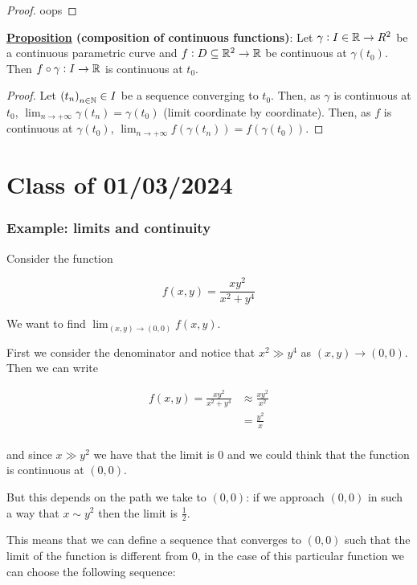 \documentclass[10pt]{extarticle}
\begin{document}
\begin{proof}
    oops
\end{proof}

\textbf{\underline{Proposition} (composition of continuous functions)}:
Let $\gamma: I \in \mathbb{R} \to R^2$ be a continuous parametric curve and $f: D \subseteq \mathbb{R}^2 \to \mathbb{R}$ be continuous at $\gamma(t_0)$.
Then $f \circ \gamma: I \to \mathbb{R}$ is continuous at $t_0$.

\begin{proof}
    Let $\left(t_n\right)_{n \in \mathbb{N}} \in I$ be a sequence converging to $t_0$.
    Then, as $\gamma$ is continuous at $t_0$, $\lim_{n \to +\infty} \gamma(t_n) = \gamma(t_0)$ (limit coordinate by coordinate).
    Then, as $f$ is continuous at $\gamma(t_0)$, $\lim_{n \to +\infty} f(\gamma(t_n)) = f(\gamma(t_0))$.
\end{proof}

\section{Class of 01/03/2024}

\subsubsection{Example: limits and continuity}

Consider the function

$$
    f(x, y) = \frac{x y^2}{x^2 + y^4}
$$

We want to find $\lim_{(x, y) \to (0, 0)} f(x, y)$.

First we consider the denominator and notice that $x^2 \gg y^4$ as $(x, y) \to (0, 0)$.
Then we can write

\begin{align*}
    f(x, y) = \frac{x y^2}{x^2 + y^4} & \approx \frac{x y^2}{x^2} \\
                                      & = \frac{y^2}{x}           \\
\end{align*}

and since $x \gg y^2$ we have that the limit is 0 and we could think that the function is continuous at $(0, 0)$.

But this depends on the path we take to $(0, 0)$: if we approach $(0, 0)$ in such a way that $x \sim y^2$ then the limit is $\frac{1}{2}$.

This means that we can define a sequence that converges to $(0, 0)$ such that the limit of the function is different from 0, in the case of this particular function we can choose the following sequence:
\end{document}
